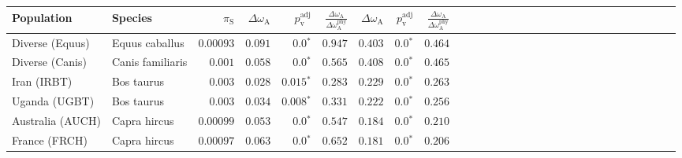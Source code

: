 \begin{center}
\begin{adjustbox}{width = 1\textwidth}
\begin{tabular}{|l|l|r|r|r|r|r|r|r|r|r|r|r|r|r|r|r|r|r|r|r|r|r|r|r|r|r|r|r|}
\toprule
                     Population &              Species & $\pi_{\textrm{S}}$ & $\Delta \omega_{\mathrm{A}} $ & $p_{\mathrm{v}}^{\mathrm{adj}}$ & $\frac{\Delta\omega_{\mathrm{A}}}{\Delta\omega_{\mathrm{A}}^{\mathrm{phy}}}$ & $\Delta \omega_{\mathrm{A}} $ & $p_{\mathrm{v}}^{\mathrm{adj}}$ & $\frac{\Delta\omega_{\mathrm{A}}}{\Delta\omega_{\mathrm{A}}^{\mathrm{phy}}}$ \\
\midrule
                Diverse (Equus) &       Equus caballus &          $0.00093$ &                      $ 0.091$ &                  $\bm{0.0{^*}}$ &                                           $ 0.947$ &                      $ 0.403$ &                  $\bm{0.0{^*}}$ &                                           $ 0.464$ \\
                Diverse (Canis) &     Canis familiaris &           $ 0.001$ &                      $ 0.058$ &                  $\bm{0.0{^*}}$ &                                           $ 0.565$ &                      $ 0.408$ &                  $\bm{0.0{^*}}$ &                                           $ 0.465$ \\
                    Iran (IRBT) &           Bos taurus &           $ 0.003$ &                      $ 0.028$ &               $\bm{ 0.015{^*}}$ &                                           $ 0.283$ &                      $ 0.229$ &                  $\bm{0.0{^*}}$ &                                           $ 0.263$ \\
                  Uganda (UGBT) &           Bos taurus &           $ 0.003$ &                      $ 0.034$ &               $\bm{ 0.008{^*}}$ &                                           $ 0.331$ &                      $ 0.222$ &                  $\bm{0.0{^*}}$ &                                           $ 0.256$ \\
               Australia (AUCH) &         Capra hircus &          $0.00099$ &                      $ 0.053$ &                  $\bm{0.0{^*}}$ &                                           $ 0.547$ &                      $ 0.184$ &                  $\bm{0.0{^*}}$ &                                           $ 0.210$ \\
                  France (FRCH) &         Capra hircus &          $0.00097$ &                      $ 0.063$ &                  $\bm{0.0{^*}}$ &                                           $ 0.652$ &                      $ 0.181$ &                  $\bm{0.0{^*}}$ &                                           $ 0.206$ \\

\end{tabular}
\end{adjustbox}
\end{center}
